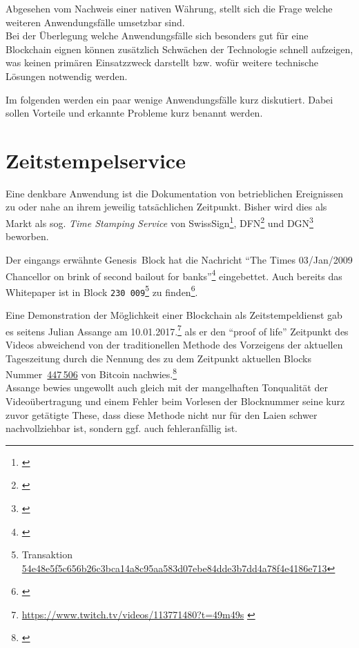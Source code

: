 Abgesehen vom Nachweis einer nativen Währung, stellt sich die Frage welche weiteren Anwendungsfälle umsetzbar sind. \\
Bei der Überlegung welche Anwendungsfälle sich besonders gut für eine Blockchain eignen können zusätzlich Schwächen der Technologie schnell aufzeigen, was keinen primären Einsatzzweck darstellt bzw. wofür weitere technische Lösungen notwendig werden.


Im folgenden werden ein paar wenige Anwendungsfälle kurz diskutiert. Dabei sollen Vorteile und erkannte Probleme kurz benannt werden.

\section{Zeitstempelservice}\label{uc:timestamping}

Eine denkbare Anwendung ist die Dokumentation von betrieblichen Ereignissen zu oder nahe an ihrem jeweilig tatsächlichen Zeitpunkt.
Bisher wird dies als Markt als sog. \emph{Time Stamping Service} von \ua{} SwissSign\footnote{\cite{w:swisssign:timestamtservice}}, \gls{DFN}\footnote{\cite{w:dfn:timestamtservice}} und \gls{DGN}\footnote{\cite{w:dgn:timestamtservice}} beworben.

Der eingangs erwähnte Genesis~Block hat die Nachricht \enquote{The Times 03/Jan/2009 Chancellor on brink of second bailout for banks}\footnote{\cite{w:blog:shirriff}} eingebettet.
Auch bereits das Whitepaper \autocite{p:bitcoin} ist in Block \texttt{230\,009}\footnote{Transaktion \href{https://blockchain.info/tx/54e48e5f5c656b26c3bca14a8c95aa583d07ebe84dde3b7dd4a78f4e4186e713}{54e48e5f5c656b26c3bca14a8c95aa583d07ebe84dde3b7dd4a78f4e4186e713}} zu finden\footnote{\cite{w:bitcoin:storeddata}}.

Eine Demonstration der Möglichkeit einer Blockchain als Zeitstempeldienst gab es seitens Julian Assange am 10.01.2017.\footnote{\url{https://www.twitch.tv/videos/113771480?t=49m49s} \cite{w:twitch:assange:timestamping}} als er den \enquote{proof of life} Zeitpunkt des Videos abweichend von der traditionellen Methode des Vorzeigens der aktuellen Tageszeitung durch die Nennung des zu dem Zeitpunkt aktuellen Blocks Nummer~\href{https://blockchain.info/block/00000000000000000178374f687728789caa92ecb49b4d850dfc173a7c0351e6}{447\,506} von Bitcoin nachwies.\footnote{\cite{w:twitch:assange:timestamping}} \\
Assange bewies ungewollt auch gleich mit der mangelhaften Tonqualität der Videoübertragung und einem Fehler beim Vorlesen der Blocknummer seine kurz zuvor getätigte These, dass diese Methode nicht nur für den Laien schwer nachvollziehbar ist, sondern ggf. auch fehleranfällig ist.


